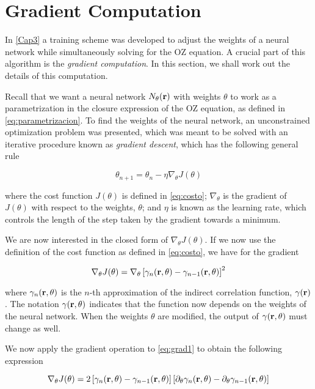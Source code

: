 \chapter{Gradient Computation}
\label{AppendixA}

In \autoref{Cap3} a training scheme was developed to adjust the weights of a neural
network while simultaneously solving for the OZ equation. A crucial part of
this algorithm is the \emph{gradient computation}. In this section, we shall work
out the details of this computation.

Recall that we want a neural network $N_{\theta}(\mathbf{r})$ with weights $\theta$ to work as a
parametrization in the closure expression of the OZ equation, as defined in
\autoref{eq:parametrizacion}. To find the weights of the neural network, an
unconstrained optimization problem was presented, which was meant to be solved with
an iterative procedure known as \emph{gradient descent}, which has the following
general rule

\[
\theta_{n+1} = \theta_{n} - \eta \nabla_{\theta} J(\theta)
\]

where the cost function $J(\theta)$ is defined in \autoref{eq:costo}; $\nabla_{\theta}$
is the gradient of $J(\theta)$ with respect to the weights, $\theta$; and $\eta$ is known
as the learning rate, which controls the length of the step taken by the gradient
towards a minimum.

We are now interested in the closed form of $\nabla_{\theta} J(\theta)$. If we now use the
definition of the cost function as defined in \autoref{eq:costo}, we have for the
gradient

\begin{equation}
    \nabla_{\theta} J(\theta) = \nabla_{\theta} \left[\gamma_{n}(\mathbf{r}, \theta) - \gamma_{n-1}(\mathbf{r}, \theta) \right]^2
    \label{eq:grad1}
\end{equation}

where $\gamma_{n}(\mathbf{r}, \theta)$ is the $n$-th approximation of the indirect
correlation function, $\gamma(\mathbf{r})$.
The notation $\gamma(\mathbf{r}, \theta)$ indicates that the function now depends
on the weights of the neural network. When the weights $\theta$ are modified, the output of
$\gamma(\mathbf{r}, \theta)$ must change as well.

We now apply the gradient operation to \autoref{eq:grad1} to obtain the following
expression

\begin{equation}
    \nabla_{\theta} J(\theta) = 2 \left[\gamma_{n}(\mathbf{r}, \theta) - \gamma_{n-1}(\mathbf{r}, \theta) \right]
    \left[ \partial_{\theta} \gamma_{n}(\mathbf{r}, \theta) - \partial_{\theta} \gamma_{n-1}(\mathbf{r}, \theta) \right]
    \label{eq:grad2}
\end{equation}


